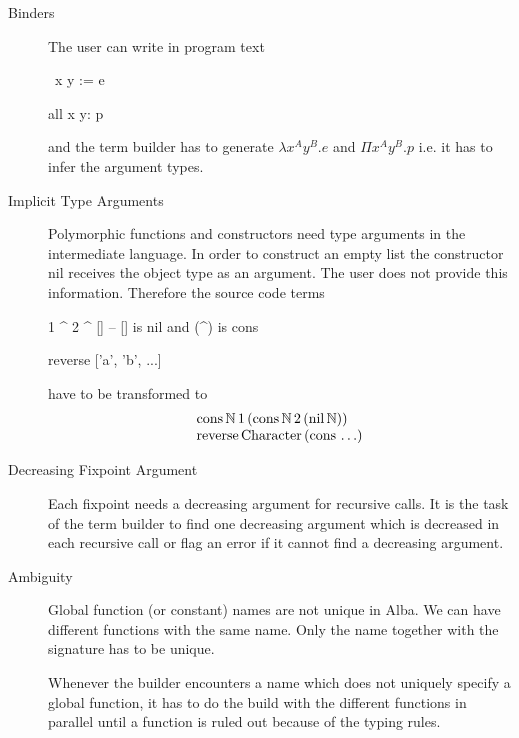 \begin{description}

\item[Binders]
  The user can write in program text
  \begin{alba}
    \ x y := e

    all x y: p
  \end{alba}
  and the term builder has to generate $\lambda x^A y^B. e$ and $\Pi
  x^A y^B  . p$ i.e. it has to infer the argument types.


\item[Implicit Type Arguments]
  Polymorphic functions and constructors need type arguments in the
  intermediate language. In order to construct an empty list the constructor
  $\text{nil}$ receives the object type as an argument. The user does not
  provide this information. Therefore the source code terms
  \begin{alba}
    1 ^ 2 ^ []           -- [] is nil and (^) is cons

    reverse ['a', 'b', ...]
  \end{alba}
  have to be transformed to
  $$
  \begin{array}{l}
    \text{cons}\, \Natural\, 1 \,(\text{cons}\, \Natural\, 2\, (\text{nil}\,
    \Natural))

    \\

    \text{reverse}\, \text{Character} \, (\text{cons}\,\ldots)
  \end{array}
  $$



\item[Decreasing Fixpoint Argument]
  Each fixpoint needs a decreasing argument for recursive calls. It is the
  task of the term builder to find one decreasing argument which is decreased
  in each recursive call or flag an error if it cannot find a decreasing
  argument.



\item[Ambiguity]
  Global function (or constant) names are not unique in Alba. We can have
  different functions with the same name. Only the name together with the
  signature has to be unique.

  Whenever the builder encounters a name which does not uniquely specify a
  global function, it has to do the build with the different functions in
  parallel until a function is ruled out because of the typing rules.

\end{description}







